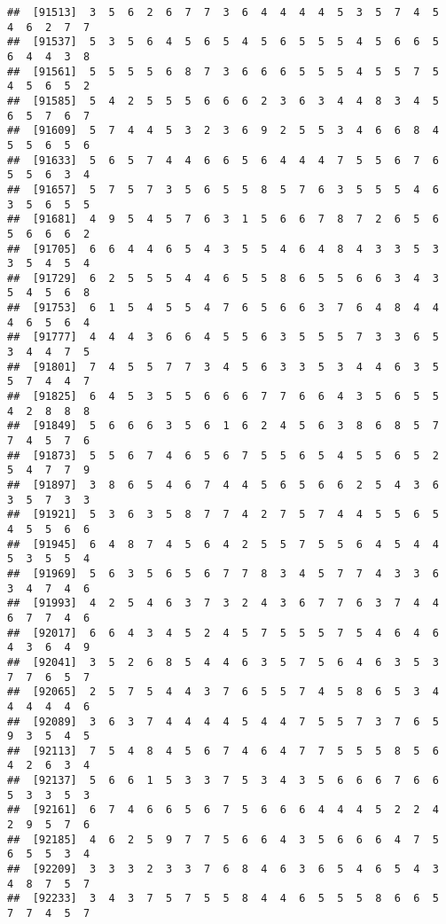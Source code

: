 \documentclass[
]{book}
\begin{document}
\begin{verbatim}
##  [91513]  3  5  6  2  6  7  7  3  6  4  4  4  4  5  3  5  7  4  5  4  6  2  7  7
##  [91537]  5  3  5  6  4  5  6  5  4  5  6  5  5  5  4  5  6  6  5  6  4  4  3  8
##  [91561]  5  5  5  5  6  8  7  3  6  6  6  5  5  5  4  5  5  7  5  4  5  6  5  2
##  [91585]  5  4  2  5  5  5  6  6  6  2  3  6  3  4  4  8  3  4  5  6  5  7  6  7
##  [91609]  5  7  4  4  5  3  2  3  6  9  2  5  5  3  4  6  6  8  4  5  5  6  5  6
##  [91633]  5  6  5  7  4  4  6  6  5  6  4  4  4  7  5  5  6  7  6  5  5  6  3  4
##  [91657]  5  7  5  7  3  5  6  5  5  8  5  7  6  3  5  5  5  4  6  3  5  6  5  5
##  [91681]  4  9  5  4  5  7  6  3  1  5  6  6  7  8  7  2  6  5  6  5  6  6  6  2
##  [91705]  6  6  4  4  6  5  4  3  5  5  4  6  4  8  4  3  3  5  3  3  5  4  5  4
##  [91729]  6  2  5  5  5  4  4  6  5  5  8  6  5  5  6  6  3  4  3  5  4  5  6  8
##  [91753]  6  1  5  4  5  5  4  7  6  5  6  6  3  7  6  4  8  4  4  4  6  5  6  4
##  [91777]  4  4  4  3  6  6  4  5  5  6  3  5  5  5  7  3  3  6  5  3  4  4  7  5
##  [91801]  7  4  5  5  7  7  3  4  5  6  3  3  5  3  4  4  6  3  5  5  7  4  4  7
##  [91825]  6  4  5  3  5  5  6  6  6  7  7  6  6  4  3  5  6  5  5  4  2  8  8  8
##  [91849]  5  6  6  6  3  5  6  1  6  2  4  5  6  3  8  6  8  5  7  7  4  5  7  6
##  [91873]  5  5  6  7  4  6  5  6  7  5  5  6  5  4  5  5  6  5  2  5  4  7  7  9
##  [91897]  3  8  6  5  4  6  7  4  4  5  6  5  6  6  2  5  4  3  6  3  5  7  3  3
##  [91921]  5  3  6  3  5  8  7  7  4  2  7  5  7  4  4  5  5  6  5  4  5  5  6  6
##  [91945]  6  4  8  7  4  5  6  4  2  5  5  7  5  5  6  4  5  4  4  5  3  5  5  4
##  [91969]  5  6  3  5  6  5  6  7  7  8  3  4  5  7  7  4  3  3  6  3  4  7  4  6
##  [91993]  4  2  5  4  6  3  7  3  2  4  3  6  7  7  6  3  7  4  4  6  7  7  4  6
##  [92017]  6  6  4  3  4  5  2  4  5  7  5  5  5  7  5  4  6  4  6  4  3  6  4  9
##  [92041]  3  5  2  6  8  5  4  4  6  3  5  7  5  6  4  6  3  5  3  7  7  6  5  7
##  [92065]  2  5  7  5  4  4  3  7  6  5  5  7  4  5  8  6  5  3  4  4  4  4  4  6
##  [92089]  3  6  3  7  4  4  4  4  5  4  4  7  5  5  7  3  7  6  5  9  3  5  4  5
##  [92113]  7  5  4  8  4  5  6  7  4  6  4  7  7  5  5  5  8  5  6  4  2  6  3  4
##  [92137]  5  6  6  1  5  3  3  7  5  3  4  3  5  6  6  6  7  6  6  5  3  3  5  3
##  [92161]  6  7  4  6  6  5  6  7  5  6  6  6  4  4  4  5  2  2  4  2  9  5  7  6
##  [92185]  4  6  2  5  9  7  7  5  6  6  4  3  5  6  6  6  4  7  5  6  5  5  3  4
##  [92209]  3  3  3  2  3  3  7  6  8  4  6  3  6  5  4  6  5  4  3  4  8  7  5  7
##  [92233]  3  4  3  7  5  7  5  5  8  4  4  6  5  5  5  8  6  6  5  7  7  4  5  7

\end{verbatim}
\end{document}
